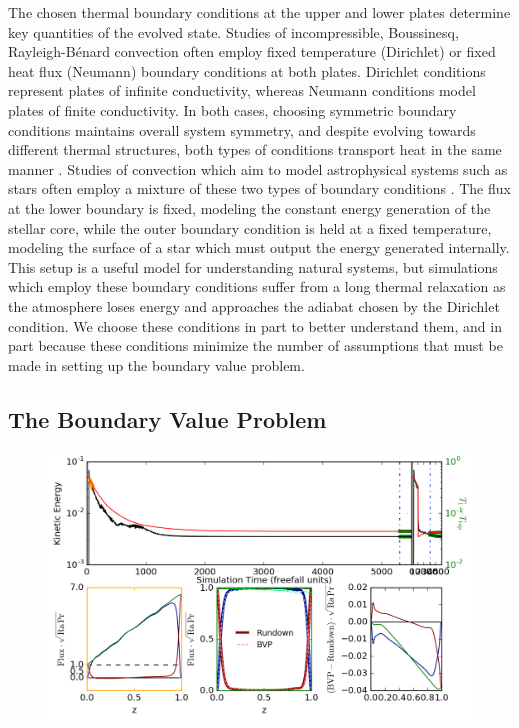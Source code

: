\documentclass[aps, pre, onecolumn, nofootinbib, notitlepage, groupedaddress, amsfonts, amssymb, amsmath, longbibliography]{revtex4-1}
\newcommand{\RB}{Rayleigh-B\'{e}nard }
\begin{document}
The chosen thermal boundary conditions at the upper and lower plates
determine key quantities of the evolved state.
Studies of incompressible, Boussinesq, \RB convection often
employ fixed temperature (Dirichlet) or fixed heat flux
(Neumann) boundary conditions at both plates.  
Dirichlet conditions represent plates of infinite conductivity,
whereas Neumann conditions model plates of finite conductivity.  
In both cases, choosing symmetric boundary conditions maintains overall system symmetry, 
and despite evolving towards different thermal structures, both types of conditions
transport heat in the same manner \cite{johnston&doering2009}.
Studies of convection which aim to model
astrophysical systems such as stars often employ a mixture of these
two types of boundary conditions \cite{hurlburt&all1984, cattaneo&all1991, korre&all2017}.  
The flux at the lower boundary is fixed, modeling
the constant energy generation of the stellar core, 
while the outer boundary condition is held at a fixed temperature,
modeling the surface of a star which must output the energy generated internally.
This setup is a useful model for understanding natural
systems, but simulations which employ these boundary conditions suffer from a long 
thermal relaxation as the atmosphere loses energy and approaches the adiabat chosen by the
Dirichlet condition.  We choose these conditions in part to better understand them, and in
part because these conditions minimize the number of assumptions that must be made in
setting up the boundary value problem.




\subsection{The Boundary Value Problem}
\begin{figure}[b]
\includegraphics[width=\textwidth]{./figs/time_trace.png}
\caption{\label{fig:time_trace} }
\end{figure}
\end{document}
